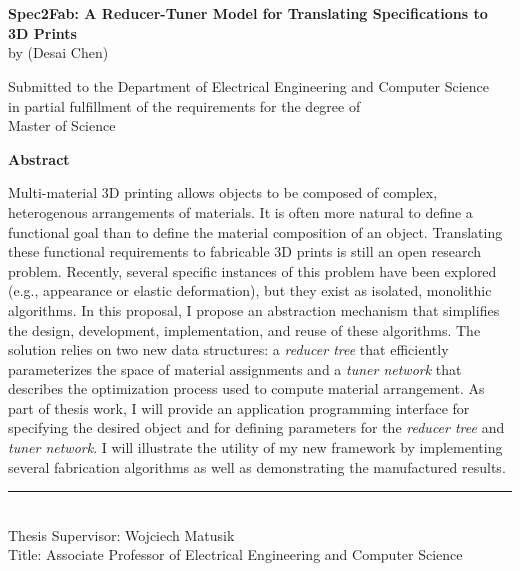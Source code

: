 \chapter*{}
\label{chap:abstract}
\begin{center}
\vspace{-8em}
{\large \textsf{\textbf{Spec2Fab: A Reducer-Tuner Model for Translating Specifications to 3D Prints}}} \\
by (Desai Chen)

\vspace{.2in}

Submitted to the Department of Electrical Engineering and Computer Science \\
in partial fulfillment of the requirements for the degree of \\
Master of Science \\ %
\end{center}

\noindent\textsf{\textbf{Abstract}}

\noindent Multi-material 3D printing allows objects to be composed of complex, heterogenous arrangements of materials. It is often more natural to define a functional goal than to define the material composition of an object. Translating these functional requirements to fabricable 3D prints is still an open research problem. Recently, several specific instances of this problem have been explored (e.g.,  appearance or elastic deformation), but they exist as isolated, monolithic algorithms. In this proposal, I propose an abstraction mechanism that simplifies the design, development, implementation, and reuse of these algorithms. The solution relies on two new data structures: a \emph{reducer tree} that efficiently parameterizes the space of material assignments and a \emph{tuner network} that describes the optimization process used to compute material arrangement. As part of thesis work, I will provide an application programming interface for specifying the desired object and for defining parameters for the \emph{reducer tree} and \emph{tuner network}. I will illustrate the utility of my new framework by implementing several fabrication algorithms as well as demonstrating the manufactured results.

\noindent\rule[0.5ex]{2in}{1pt} \\
Thesis Supervisor: Wojciech Matusik\\
Title:  Associate Professor of Electrical Engineering and Computer Science



